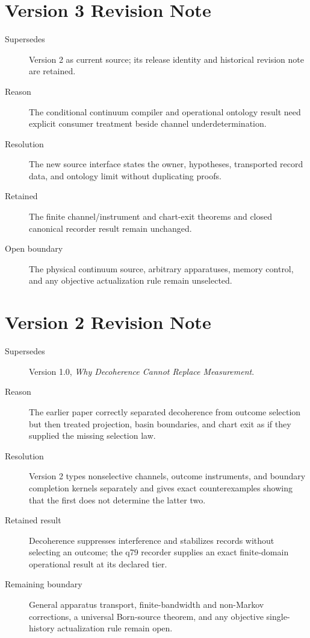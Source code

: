 \documentclass[11pt]{article}
\begin{document}
\section*{Version 3 Revision Note}
\begin{description}
\item[Supersedes] Version 2 as current source; its release identity and
historical revision note are retained.
\item[Reason] The conditional continuum compiler and operational ontology
result need explicit consumer treatment beside channel underdetermination.
\item[Resolution] The new source interface states the owner, hypotheses,
transported record data, and ontology limit without duplicating proofs.
\item[Retained] The finite channel/instrument and chart-exit theorems and
closed canonical recorder result remain unchanged.
\item[Open boundary] The physical continuum source, arbitrary apparatuses,
memory control, and any objective actualization rule remain unselected.
\end{description}

\section*{Version 2 Revision Note}
\begin{description}
\item[Supersedes] Version 1.0, \emph{Why Decoherence Cannot Replace
Measurement}.
\item[Reason] The earlier paper correctly separated decoherence from outcome
selection but then treated projection, basin boundaries, and chart exit as if
they supplied the missing selection law.
\item[Resolution] Version 2 types nonselective channels, outcome instruments,
and boundary completion kernels separately and gives exact counterexamples
showing that the first does not determine the latter two.
\item[Retained result] Decoherence suppresses interference and stabilizes
records without selecting an outcome; the q79 recorder supplies an exact
finite-domain operational result at its declared tier.
\item[Remaining boundary] General apparatus transport, finite-bandwidth and
non-Markov corrections, a universal Born-source theorem, and any objective
single-history actualization rule remain open.
\end{description}
\end{document}
